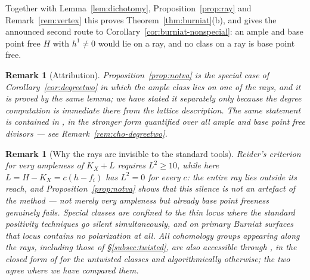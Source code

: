 \documentclass[10pt,a4paper]{amsart}
\newtheorem{remark}[theorem]{Remark}
\begin{document}
Together with Lemma~\ref{lem:dichotomy}, Proposition~\ref{prop:ray} and Remark~\ref{rem:vertex} this proves Theorem~\ref{thm:burniat}(b), and gives the announced second route to Corollary~\ref{cor:burniat-nonspecial}: an ample and base point free $H$ with $h^1\neq0$ would lie on a ray, and no class on a ray is base point free.

\begin{remark}[Attribution]\label{rem:cho-notva}
Proposition~\ref{prop:notva} is the special case of Corollary~\ref{cor:degreetwo} in which the ample class lies on one of the rays, and it is proved by the same lemma; we have stated it separately only because the degree computation is immediate there from the lattice description. The same statement is contained in \cite[Prop.~5.4]{Cho26}, in the stronger form quantified over all ample and base point free divisors --- see Remark~\ref{rem:cho-degreetwo}.
\end{remark}

\begin{remark}[Why the rays are invisible to the standard tools]\label{rem:reider-silent}
Reider's criterion for very ampleness of $K_X+L$ requires $L^2\ge10$, while here $L=H-K_X=c(h-f_i)$ has $L^2=0$ for every $c$: the entire ray lies outside its reach, and Proposition~\ref{prop:notva} shows that this silence is not an artefact of the method --- not merely very ampleness but already base point freeness genuinely fails. Special classes are confined to the thin locus where the standard positivity techniques go silent simultaneously, and on primary Burniat surfaces that locus contains no polarization at all. All cohomology groups appearing along the rays, including those of \S\ref{subsec:twisted}, are also accessible through \cite{Cho26}, in the closed form of \cite[Prop.~4.27]{Cho26} for the untwisted classes and algorithmically otherwise; the two agree where we have compared them.
\end{remark}
\end{document}
